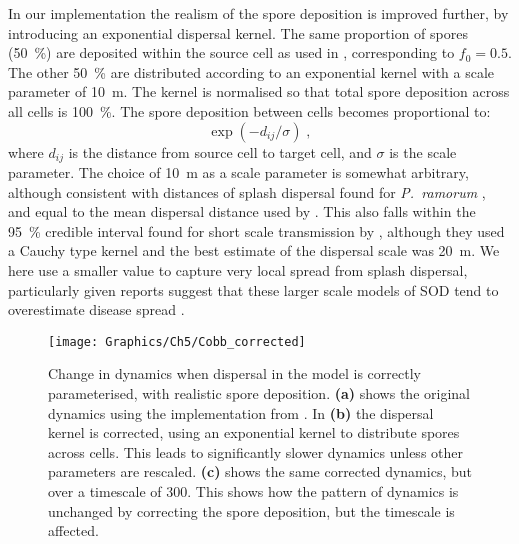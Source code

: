 In our implementation the realism of the spore deposition is improved further, by introducing an exponential dispersal kernel. The same proportion of spores (\SI{50}{\percent}) are deposited within the source cell as used in \citet{cobb_ecosystem_2012}, corresponding to $f_0=\num{0.5}$. The other \SI{50}{\percent} are distributed according to an exponential kernel with a scale parameter of \SI{10}{\meter}. The kernel is normalised so that total spore deposition across all cells is \SI{100}{\percent}. The spore deposition between cells becomes proportional to:
\begin{equation}\label{eqn:ch5:spore_kernel}
    \exp{\left(-d_{ij}/\sigma\right)}\;,
\end{equation}
where $d_{ij}$ is the distance from source cell to target cell, and $\sigma$ is the scale parameter. The choice of \SI{10}{\meter} as a scale parameter is somewhat arbitrary, although consistent with distances of splash dispersal found for \emph{P.~ramorum} \citep{davidson_transmission_2005}, and equal to the mean dispersal distance used by \citet{cobb_ecosystem_2012}. This also falls within the \SI{95}{\percent} credible interval found for short scale transmission by \citet{meentemeyer_epidemiological_2011}, although they used a Cauchy type kernel and the best estimate of the dispersal scale was \SI{20}{\meter}. We here use a smaller value to capture very local spread from splash dispersal, particularly given reports suggest that these larger scale models of SOD tend to overestimate disease spread \citep{valachovic_well_2017}.

\begin{figure}[t]
    \begin{center}
        \texttt{[image: Graphics/Ch5/Cobb\_corrected]}
        \caption[Change in model dynamics under corrected parameters]{Change in dynamics when dispersal in the model is correctly parameterised, with realistic spore deposition. \textbf{(a)} shows the original dynamics using the implementation from \citet{cobb_ecosystem_2012}. In \textbf{(b)} the dispersal kernel is corrected, using an exponential kernel to distribute spores across cells. This leads to significantly slower dynamics unless other parameters are rescaled. \textbf{(c)} shows the same corrected dynamics, but over a timescale of \SI{300}{\years}. This shows how the pattern of dynamics is unchanged by correcting the spore deposition, but the timescale is affected.\label{fig:ch5:cobb_spatial_rate}}
    \end{center}
\end{figure}

